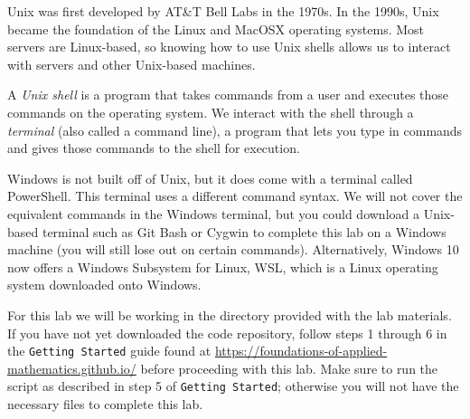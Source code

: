 \label{lab:Shell}


Unix was first developed by AT\&T Bell Labs in the 1970s. 
In the 1990s, Unix became the foundation of the Linux and MacOSX operating systems.
Most servers are Linux-based, so knowing how to use Unix shells allows us to interact with servers and other Unix-based machines.

A \emph{Unix shell} is a program that takes commands from a user and executes those commands on the operating system. 
We interact with the shell through a \emph{terminal} (also called a command line), a program that lets you type in commands and gives those commands to the shell for execution.

\begin{info} %
Windows is not built off of Unix, but it does come with a terminal called PowerShell.
This terminal uses a different command syntax.
We will not cover the equivalent commands in the Windows terminal, but you could download a Unix-based terminal such as Git Bash or Cygwin to complete this lab on a Windows machine (you will still lose out on certain commands). 
Alternatively, Windows 10 now offers a Windows Subsystem for Linux, WSL, which is a Linux operating system downloaded onto Windows.
\end{info}

\begin{info}
For this lab we will be working in the  directory provided with the lab materials. 
If you have not yet downloaded the code repository, follow steps 1 through 6 in the \texttt{Getting Started} guide found at \url{https://foundations-of-applied-mathematics.github.io/} before proceeding with this lab.
Make sure to run the  script as described in step 5 of \texttt{Getting Started}; otherwise you will not have the necessary files to complete this lab. 
\end{info}

